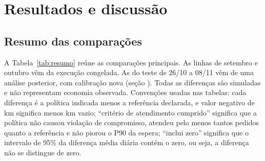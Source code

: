 \section{Resultados e discussão}\label{sec:resultados}

\subsection{Resumo das comparações}

A Tabela~\ref{tab:resumo} reúne as comparações principais. As linhas de setembro e outubro vêm da execução congelada. As do teste de 26/10 a 08/11 vêm de uma análise posterior, com calibração nova (seção ). Todas as diferenças são simuladas e não representam economia observada. Convenções usadas nas tabelas: cada diferença é a política indicada menos a referência declarada, e valor negativo de km significa menos km vazio; \enquote{critério de atendimento cumprido} significa que a política não causou violação de compromisso, atendeu pelo menos tantos pedidos quanto a referência e não piorou o P90 da espera; \enquote{inclui zero} significa que o intervalo de 95\% da diferença média diária contém o zero, ou seja, a diferença não se distingue de zero.

